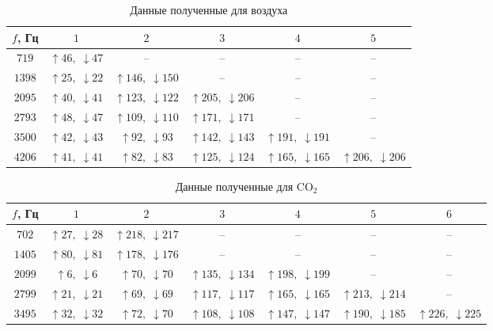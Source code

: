 \documentclass[a4paper,12pt]{article} %
\begin{document}
\begin{table}[h]
\begin{center}
\begin{tabular}{|c||c|c|c|c|c|}
\hline 
$f$, Гц & $1$ & $2$ & $3$ & $4$ & $5$ \\ 
\hline 
$ 719 $ & $ \uparrow 46 , \; \downarrow 47 $ & -- & -- & -- & -- \\ 
\hline 
$ 1398 $ & $ \uparrow 25 , \; \downarrow 22 $ & $ \uparrow 146 , \; \downarrow 150 $ & -- & -- & -- \\ 
\hline 
$ 2095 $ & $ \uparrow 40 , \; \downarrow 41 $ & $ \uparrow 123 , \; \downarrow 122 $ & $ \uparrow 205 , \; \downarrow 206 $ & -- & -- \\ 
\hline 
$ 2793 $ & $ \uparrow 48 , \; \downarrow 47 $ & $ \uparrow 109 , \; \downarrow 110 $ & $ \uparrow 171 , \; \downarrow 171 $ & -- & -- \\ 
\hline 
$ 3500 $ & $ \uparrow 42 , \; \downarrow 43 $ & $ \uparrow 92 , \; \downarrow 93 $ & $ \uparrow 142 , \; \downarrow 143 $ & $ \uparrow 191 , \; \downarrow 191 $ & -- \\ 
\hline 
$ 4206 $ & $ \uparrow 41 , \; \downarrow 41 $ & $ \uparrow 82 , \; \downarrow 83 $ & $ \uparrow 125 , \; \downarrow 124 $ & $ \uparrow 165 , \; \downarrow 165 $ & $ \uparrow 206 , \; \downarrow 206 $ \\ 
\hline 
\end{tabular} 
\end{center}
\caption{Данные полученные для воздуха}
\label{air}
\end{table}

\begin{table}[h]
\begin{small}
\begin{center}
\begin{tabular}{|c|c|c|c|c|c|c|}
\hline 
$f$, Гц & $1$ & $2$ & $3$ & $4$ & $5$ & $6$ \\ 
\hline 
$702$ & $ \uparrow 27 , \; \downarrow 28 $ & $ \uparrow 218 , \; \downarrow 217 $ & -- & -- & -- & -- \\ 
\hline 
$1405$ & $ \uparrow 80 , \; \downarrow 81 $ & $ \uparrow 178 , \; \downarrow 176 $ & -- & -- & -- & -- \\ 
\hline 
$2099$ & $ \uparrow 6 , \; \downarrow 6 $ & $ \uparrow 70 , \; \downarrow 70 $ & $ \uparrow 135 , \; \downarrow 134 $ & $ \uparrow 198 , \; \downarrow 199 $ & -- & -- \\ 
\hline 
$2799$ & $ \uparrow 21 , \; \downarrow 21 $ & $ \uparrow 69 , \; \downarrow 69 $ & $ \uparrow 117 , \; \downarrow 117 $ & $ \uparrow 165 , \; \downarrow 165 $ & $ \uparrow 213 , \; \downarrow 214 $ & -- \\ 
\hline 
$3495$ & $ \uparrow 32 , \; \downarrow 32 $ & $ \uparrow 72 , \; \downarrow 70 $ & $ \uparrow 108 , \; \downarrow 108 $ & $ \uparrow 147 , \; \downarrow 147 $ & $ \uparrow 190 , \; \downarrow 185 $ & $ \uparrow 226 , \; \downarrow 225 $ \\ 
\hline 
\end{tabular} 
\end{center}
\end{small}
\caption{Данные полученные для CO$_2$}
\label{co2}
\end{table}
\end{document}
